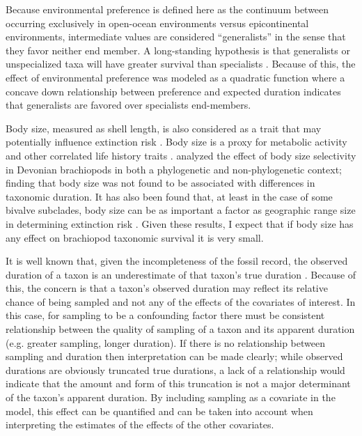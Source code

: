 \documentclass{article}
\begin{document}
Because environmental preference is defined here as the continuum between occurring exclusively in open-ocean environments versus epicontinental environments, intermediate values are considered ``generalists'' in the sense that they favor neither end member. A long-standing hypothesis is that generalists or unspecialized taxa will have greater survival than specialists \citep{Simpson1944,Liow2004a,Liow2007b,Nurnberg2013a,Nurnberg2015,Baumiller1993,Smits2015}. Because of this, the effect of environmental preference was modeled as a quadratic function where a concave down relationship between preference and expected duration indicates that generalists are favored over specialists end-members.

Body size, measured as shell length, is also considered as a trait that may potentially influence extinction risk \citep{Payne2014,Harnik2011}. Body size is a proxy for metabolic activity and other correlated life history traits \citep{Payne2014}. \citet{Harnik2014} analyzed the effect of body size selectivity in Devonian brachiopods in both a phylogenetic and non-phylogenetic context; finding that body size was not found to be associated with differences in taxonomic duration. It has also been found that, at least in the case of some bivalve subclades, body size can be as important a factor as geographic range size in determining extinction risk \citep{Harnik2011}. Given these results, I expect that if body size has any effect on brachiopod taxonomic survival it is very small.

It is well known that, given the incompleteness of the fossil record, the observed duration of a taxon is an underestimate of that taxon's true duration \citep{Solow1997,Wagner2013a,Wang2004,Liow2010b,Alroy2014a,Foote1996e}. Because of this, the concern is that a taxon's observed duration may reflect its relative chance of being sampled and not any of the effects of the covariates of interest. In this case, for sampling to be a confounding factor there must be consistent relationship between the quality of sampling of a taxon and its apparent duration (e.g. greater sampling, longer duration). If there is no relationship between sampling and duration then interpretation can be made clearly; while observed durations are obviously truncated true durations, a lack of a relationship would indicate that the amount and form of this truncation is not a major determinant of the taxon's apparent duration. By including sampling as a covariate in the model, this effect can be quantified and can be taken into account when interpreting the estimates of the effects of the other covariates.
\end{document}
